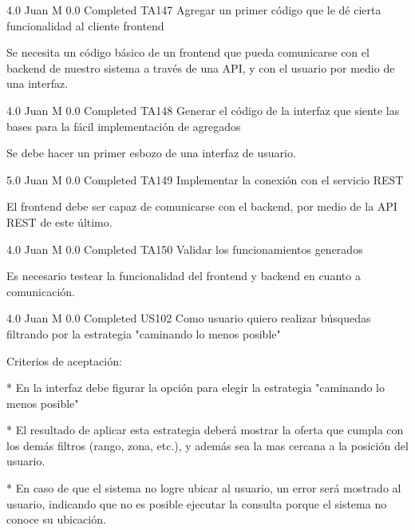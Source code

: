 		{4.0} %
		{Juan M} %
		{0.0} %
		{Completed} %
	\task
		{TA147} %
		{Agregar un primer código que le dé cierta funcionalidad al cliente frontend} %
		{Se necesita un código básico de un frontend que pueda comunicarse con el
backend de nuestro sistema a través de una API, y con el usuario por medio de
una interfaz.

} %
		{4.0} %
		{Juan M} %
		{0.0} %
		{Completed} %
	\task
		{TA148} %
		{Generar el código de la interfaz que siente las bases para la fácil implementación de agregados} %
		{Se debe hacer un primer esbozo de una interfaz de usuario.

} %
		{5.0} %
		{Juan M} %
		{0.0} %
		{Completed} %
	\task
		{TA149} %
		{Implementar la conexión con el servicio REST} %
		{El frontend debe ser capaz de comunicarse con el backend, por medio de la API
REST de este último.

} %
		{4.0} %
		{Juan M} %
		{0.0} %
		{Completed} %
	\task
		{TA150} %
		{Validar los funcionamientos generados} %
		{Es necesario testear la funcionalidad del frontend y backend en cuanto a
comunicación.

} %
		{4.0} %
		{Juan M} %
		{0.0} %
		{Completed} %
\userStory
	{US102} %
	{Como usuario quiero realizar búsquedas filtrando por la estrategia "caminando lo menos posible"} %
	{Criterios de aceptación:

  

* En la interfaz debe figurar la opción para elegir la estrategia "caminando lo menos posible"

* El resultado de aplicar esta estrategia deberá mostrar la oferta que cumpla con los demás filtros (rango, zona, etc.), y además sea la mas cercana a la posición del usuario.

* En caso de que el sistema no logre ubicar al usuario, un error será mostrado al usuario, indicando que no es posible ejecutar la consulta porque el sistema no conoce su ubicación.

} %
	{} %
